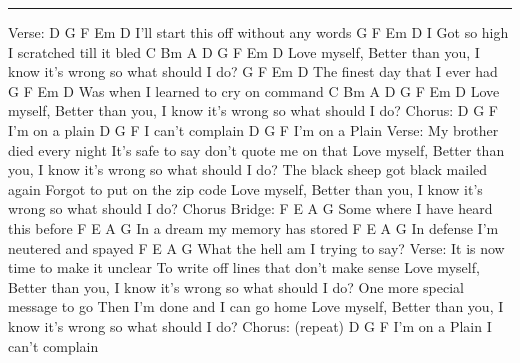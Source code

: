 \noindent\rule{\columnwidth}{1pt}

\begin{lstsong}
Verse:
D      G         F     Em        D           
I'll start this off without any words
  G       F      Em                D
I Got so high I scratched till it bled
C    Bm       A          D         G      F        Em             D
Love myself, Better than you, I know it's wrong so what should I do?
    G       F       Em       D
The finest day that I ever had
      G      F        Em      D
Was when I learned to cry on command
C    Bm       A          D         G      F        Em             D    
Love myself, Better than you, I know it's wrong so what should I do?
Chorus:
D   G   F  
          I'm on a plain 
D   G   F 
          I can't complain 
D   G   F 
          I'm on a Plain 
Verse:
My brother died every night
It's safe to say don't quote me on that
Love myself, Better than you, I know it's wrong so what should I do?
The black sheep got black mailed again
Forgot to put on the zip code
Love myself, Better than you, I know it's wrong so what should I do?
Chorus
Bridge:
F         E                  A        G
Some where I have heard this before
F      E                  A        G
In a dream my memory has stored
F      E                    A        G
In defense I'm neutered and spayed
F         E                  A        G
What the hell am I trying to say?
Verse:  
It is now time to make it unclear
To write off lines that don't make sense
Love myself, Better than you, I know it's wrong so what should I do?
One more special message to go
Then I'm done and I can go home
Love myself, Better than you, I know it's wrong so what should I do?
Chorus: (repeat)
D   G   F  
          I'm on a Plain 
          I can't complain 
\end{lstsong}
\newpage

